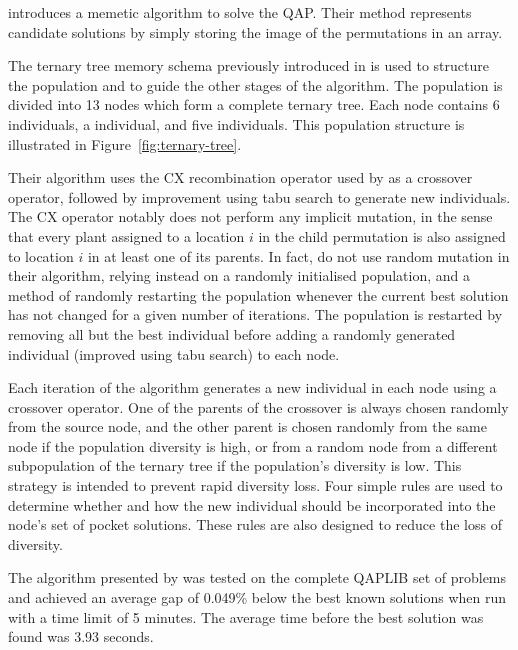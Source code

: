 {    %

    \citet{Harris:2015kw} introduces a memetic algorithm to solve the QAP.
    Their method represents candidate solutions by simply storing the image of the permutations in an array.

    The ternary tree memory schema previously introduced in \citet{Inostroza:2008md} is used to structure the population and to guide the other stages of the algorithm.
    The population is divided into 13 nodes which form a complete ternary tree. Each node contains 6 individuals, a  individual, and five  individuals.
    This population structure is illustrated in Figure~\ref{fig:ternary-tree}.

	Their algorithm uses the CX recombination operator used by \citet{Merz:2000ek} as a crossover operator, followed by improvement using tabu search to generate new individuals.
	The CX operator notably does not perform any implicit mutation, in the sense that every plant assigned to a location \(i\) in the child permutation is also assigned to location \(i\) in at least one of its parents.
	In fact, \citeauthor{Harris:2015kw} do not use random mutation in their algorithm, relying instead on a randomly initialised population, and a method of randomly restarting the population whenever the current best solution has not changed for a given number of iterations. The population is restarted by removing all but the best individual before adding a randomly generated individual (improved using tabu search) to each node.

	Each iteration of the algorithm generates a new individual in each node using a crossover operator. One of the parents of the crossover is always chosen randomly from the source node, and the other parent is chosen randomly from the same node if the population diversity is high, or from a random node from a different subpopulation of the ternary tree if the population's diversity is low. This strategy is intended to prevent rapid diversity loss. Four simple rules are used to determine whether and how the new individual should be incorporated into the node's set of pocket solutions. These rules are also designed to reduce the loss of diversity.

	The algorithm presented by \citeauthor{Harris:2015kw} was tested on the complete QAPLIB set of problems and achieved an average gap of 0.049\% below the best known solutions when run with a time limit of 5 minutes. The average time before the best solution was found was 3.93 seconds.

}
